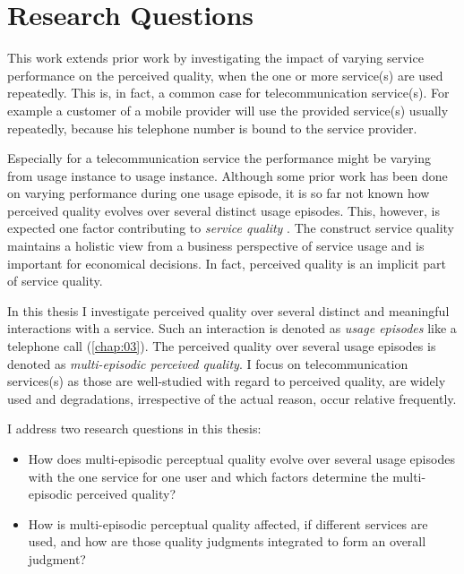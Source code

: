\section{Research Questions}
This work extends prior work by investigating the impact of varying service performance on the perceived quality, when the one or more service(s) are used repeatedly.
This is, in fact, a common case for telecommunication service(s).
For example a customer of a mobile  provider will use the provided service(s) usually repeatedly, because his telephone number is bound to the service provider.

Especially for a telecommunication service the performance might be varying from usage instance to usage instance.
Although some prior work has been done on varying performance during one usage episode, it is so far not known how perceived quality evolves over several distinct usage episodes.
This, however, is expected one factor contributing to \emph{service quality} \citep[\cf][]{zeithaml_behavioral_1996}.
The construct service quality maintains a holistic view from a business perspective of service usage and is important for economical decisions.
In fact, perceived quality is an implicit part of service quality.

In this thesis I investigate perceived quality over several distinct and meaningful interactions with a service.
Such an interaction is denoted as \emph{usage episodes} like a telephone call (\cf \autoref{chap:03}).
The perceived quality over several usage episodes is denoted as \emph{multi-episodic perceived quality}.
I focus on telecommunication services(s) as those are well-studied with regard to perceived quality, are widely used and degradations, irrespective of the actual reason, occur relative frequently.

I address two research questions in this thesis:
\begin{itemize}
\item How does multi-episodic perceptual quality evolve over several usage episodes with the one service for one user and which factors determine the multi-episodic perceived quality?
\item How is multi-episodic perceptual quality affected, if different services are used, and how are those quality judgments integrated to form an overall judgment?
\end{itemize}

